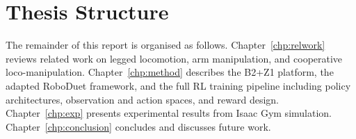 \section{Thesis Structure}

The remainder of this report is organised as follows.
Chapter~\ref{chp:relwork} reviews related work on legged locomotion, arm
manipulation, and cooperative loco-manipulation.
Chapter~\ref{chp:method} describes the B2+Z1 platform, the adapted RoboDuet
framework, and the full RL training pipeline including policy architectures,
observation and action spaces, and reward design.
Chapter~\ref{chp:exp} presents experimental results from Isaac Gym simulation.
Chapter~\ref{chp:conclusion} concludes and discusses future work.
